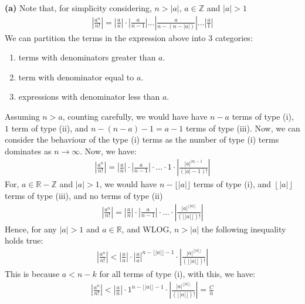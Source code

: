 \documentclass[12pt]{book}
\theoremstyle{definition}
\begin{document}
\begin{sol}
\textbf{(a)} Note that, for simplicity considering, $n>|a|$, $a \in \mathbb{Z}$ and $|a|>1$
\begin{align*}
	\left|\frac{a^n}{n!}\right| = \left|\frac{a}{n}\right|\cdot \left|\frac{a}{n-1}\right| ... \left|\frac{a}{n-(n-|a|)}\right| ... \left|\frac{a}{1}\right|
\end{align*}
We can partition the terms in the expression above into 3 categories: 
\begin{enumerate}[label=(\roman*)]
	\item terms with denominators greater than $a$.
	\item term with denominator equal to $a$.
	\item expressions with denominator less than $a$.
\end{enumerate}
Assuming $n>a$, counting carefully, we would have have $n-a$ terms of type (i), $1$ term of type (ii), and $n-(n-a)-1=a-1$ terms of type (iii).
Now, we can consider the behaviour of the type (i) terms as the number of type (i) terms dominates as $n\to \infty$. Now, we have:
\begin{align*}
	\left|\frac{a^n}{n!}\right| = \left|\frac{a}{n}\right|\cdot \left|\frac{a}{n-1}\right| \cdot ... \cdot 1 \cdot \left| \frac{|a|^{|a|-1}}{(|a|-1)!}\right|
\end{align*}
For, $a \in \mathbb{R}-\mathbb{Z}$ and $|a|>1$, we would have $n - \lfloor |a| \rfloor$ terms of type (i), and $\left\lfloor |a| \right\rfloor$ terms of type (iii), and no terms of type (ii)
\begin{align*}
	\left|\frac{a^n}{n!}\right| = \left|\frac{a}{n}\right|\cdot \left|\frac{a}{n-1}\right| \cdot ... \cdot  \left| \frac{|a|^{\lfloor |a| \rfloor}}{(\lfloor |a| \rfloor)!}\right|
\end{align*}
Hence, for any $|a|>1$ and $a \in \mathbb{R}$, and WLOG, $n>|a|$ the following inequality holds true:
\begin{align*}
	\left|\frac{a^n}{n!}\right| < \left| \frac{a}{n} \right|\cdot \left| \frac{a}{a} \right|^{n -\lfloor |a| \rfloor-1} \cdot \left| \frac{|a|^{\lfloor |a| \rfloor}}{(\lfloor |a| \rfloor)!}\right|
\end{align*}
This is because $a< n-k$ for all terms of type (i), with this, we have:
\begin{align*}
	\left|\frac{a^n}{n!}\right| < \left| \frac{a}{n} \right|\cdot 1^{n -\lfloor |a| \rfloor-1} \cdot \left| \frac{|a|^{\lfloor |a| \rfloor}}{(\lfloor |a| \rfloor)!}\right| =  \frac{C}{n}
\end{align*}

\end{sol}
\end{document}
